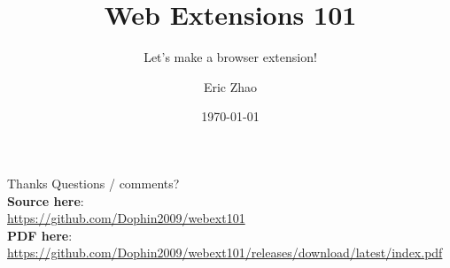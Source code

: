 \documentclass[xcolor={dvipsnames},xtable]{beamer}
\title{Web Extensions 101}
\subtitle{Let's make a browser extension!}
\date{\today}
\author{Eric Zhao}
\begin{document}

\newcommand{\sectiontitle}{}
\newcommand{\currenttitle}{}

\maketitle

\newcommand{\subdir}{sections}
\newcommand{\emojisubdir}{emojisub}
\newcommand{\templatedir}{template}






\renewcommand{\currenttitle}{Thanks}
\begin{frame}{\currenttitle}
  Questions / comments? \\[3em]

  \textbf{Source here}: \\
  {\scriptsize \url{https://github.com/Dophin2009/webext101}} \\[1em]

  \textbf{PDF here}: \\
  {\scriptsize \url{https://github.com/Dophin2009/webext101/releases/download/latest/index.pdf}}
\end{frame}
\end{document}
